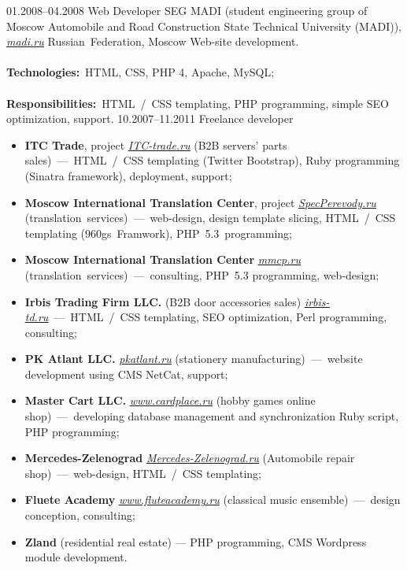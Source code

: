 \documentclass[12pt,a4paper,final]{moderncv}
\begin{document}
%
\cventry
{01.2008--04.2008}
{Web Developer}
{
  SEG MADI (student engineering group of Moscow Automobile and Road Construction State Technical University (MADI)), \underline{\href{http://madi.ru}{\itshape madi.ru}}
}
{Russian~Federation, Moscow}
{}
{
  Web-site development.\\\\
  \textbf{Technologies:}~HTML, CSS, PHP 4, Apache, MySQL;\\\\
  \textbf{Responsibilities:}~HTML~/~CSS templating, PHP programming, simple SEO optimization, support.
}
%
\cventry
{10.2007--11.2011}
{Freelance developer}{}{}{}{
\begin{itemize}
  \item \textbf{ITC Trade}, project \underline{\href{http://itc-trade.ru}{\itshape ITC-trade.ru}} (B2B servers' parts sales)~---~HTML~/~CSS templating (Twitter Bootstrap), Ruby programming (Sinatra framework), deployment, support;
  \item \textbf{Moscow International Translation Center}, project \underline{\href{http://specperevody.ru}{\itshape SpecPerevody.ru}} (translation~services)~---~web-design, design template slicing, HTML~/~CSS templating (960gs~Framwork), PHP~5.3~programming;
  \item \textbf{Moscow International Translation Center} \underline{\href{http://mmcp.ru}{\itshape mmcp.ru}} (translation~services)~---~consulting, PHP~5.3 programming, web-design;
  \item \textbf{Irbis Trading Firm LLC.} (B2B door accessories sales) \underline{\href{http://irbis-td.ru}{\itshape irbis-td.ru}}~---~HTML~/~CSS templating, SEO optimization, Perl programming, consulting;
  \item \textbf{PK Atlant LLC.} \underline{\href{http://pkatlant.ru}{\itshape pkatlant.ru}} (stationery manufacturing)~---~website development using CMS NetCat, support;
  \item \textbf{Master Cart LLC.} \underline{\href{http://www.cardplace.ru}{\itshape www.cardplace.ru}} (hobby games online shop)~---~developing database management and synchronization Ruby script, PHP programming;
  \item \textbf{Mercedes-Zelenograd} \underline{\href{http://mercedes-zelenograd.ru}{\itshape Mercedes-Zelenograd.ru}} (Automobile repair shop)~---~web-design, HTML~/~CSS templating;
  \item \textbf{Fluete Academy} \underline{\href{http://www.fluteacademy.ru}{\itshape www.fluteacademy.ru}} (classical music ensemble)~---~design conception, consulting;
  \item \textbf{Zland} (residential real estate) --- PHP programming, CMS Wordpress module development.
\end{itemize}}
\end{document}
